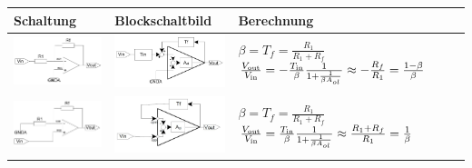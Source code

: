 \begin{tabularx}{\linewidth}{llX}
	\textbf{Schaltung} & \textbf{Blockschaltbild} & \textbf{Berechnung} \\ \hline
	\includegraphics[width=4cm]{images/op_inv_sch.jpg} & 
	\includegraphics[width=4cm]{images/op_inv_block.jpg} & 
	$\beta = T_f = \frac{R_1}{R_1 + R_f}$ \newline
	$\frac{V_{\operatorname{\text{out}}}}{V_{\operatorname{\text{in}}}} = -\frac{T_{\operatorname{\text{in}}}}{\beta} \frac{1}{1+\frac{1}{\beta A_{ol}}} \approx -\frac{R_f}{R_1} = \frac{1-\beta}{\beta}$ \\
	\includegraphics[width=4cm]{images/op_ninv_sch.jpg} & 
	\includegraphics[width=4cm]{images/op_ninv_block.jpg} & 
	$\beta = T_f = \frac{R_1}{R_1 + R_f}$ \newline
	$\frac{V_{\operatorname{\text{out}}}}{V_{\operatorname{\text{in}}}} = \frac{T_{\operatorname{\text{in}}}}{\beta} \frac{1}{1+\frac{1}{\beta A_{ol}}} \approx \frac{R_1 + R_f}{R_1} = \frac{1}{\beta} $\\ \hline
\end{tabularx}

